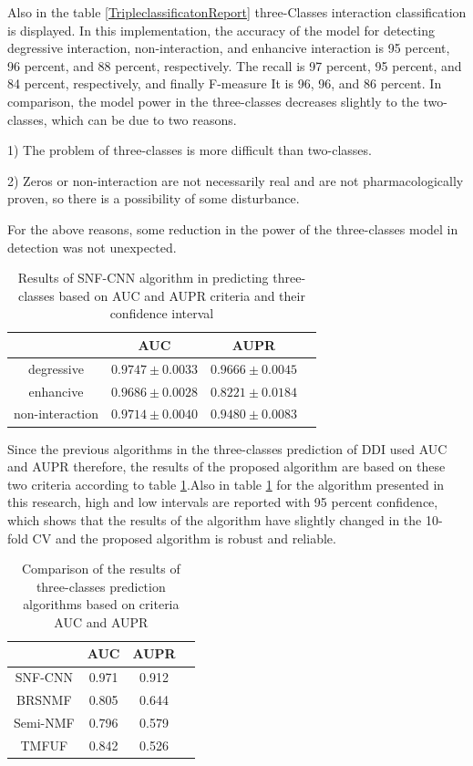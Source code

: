 \documentclass{bmcart}
\begin{document}
Also in the table
\ref{TripleclassificatonReport}
three-Classes interaction classification is displayed. In this implementation, the accuracy of the model for detecting degressive interaction, non-interaction, and enhancive interaction is 95 percent, 96 percent, and 88 percent, respectively. The recall is 97 percent, 95 percent, and 84 percent, respectively, and finally F-measure It is 96, 96, and 86 percent. In comparison, the model power in the three-classes decreases slightly to the two-classes, which can be due to two reasons.

1) The problem of three-classes is more difficult than two-classes.

2) Zeros or non-interaction are not necessarily real and are not pharmacologically proven, so there is a possibility of some disturbance.

For the above reasons, some reduction in the power of the three-classes model in detection was not unexpected.

\begin{table}[h!]
\centering 
\begin{tabular}{|c|c|c|c|}
\hline
& AUC & AUPR\\
\hline
degressive	& $0.9747 \pm 0.0033$ & $0.9666 \pm 0.0045$\\
\hline
enhancive  & $0.9686 \pm 0.0028$ & $0.8221 \pm 0.0184$\\
\hline
non-interaction & $0.9714 \pm 0.0040$ & $0.9480 \pm 0.0083$\\
\hline
\end{tabular}
\newline
	\caption{Results of SNF-CNN algorithm in predicting three-classes based on AUC and AUPR criteria and their confidence interval}
	\label{SNF-CNNresult}
\end{table}

Since the previous algorithms in the three-classes prediction of DDI used AUC and AUPR therefore, the results of the proposed algorithm are based on these two criteria according to table
\ref{SNF-CNNresult}.Also in table
\ref{SNF-CNNresult}
for the algorithm presented in this research, high and low intervals are reported with 95 percent confidence, which shows that the results of the algorithm have slightly changed in the 10- fold CV and the proposed algorithm is robust and reliable.

\begin{table}[h!]
\centering 
\begin{tabular}{|c|c|c|c|}
\hline
& AUC	& AUPR \\
\hline
SNF-CNN	& 0.971 & 0.912\\
\hline
BRSNMF\cite{shi2019detecting}  & 0.805 & 0.644\\
\hline
Semi-NMF \cite{yu2018predicting} & 0.796 & 0.579\\
\hline
TMFUF\cite{shi2018tmfuf}   & 0.842  & 0.526\\
\hline
\end{tabular}
\newline 
	\caption{Comparison of the results of three-classes prediction algorithms based on criteria AUC and AUPR}
	\label{AUCAUPR}
\end{table}
\end{document}
